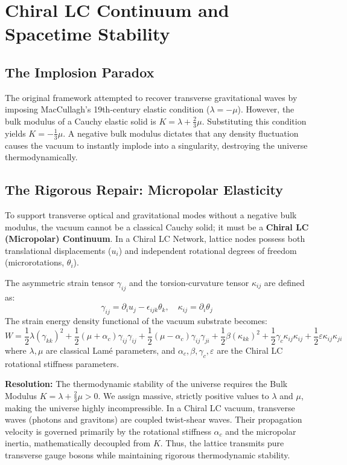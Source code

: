 \documentclass[11pt,a4paper]{article}
\begin{document}
\section{Chiral LC Continuum and Spacetime Stability}

\subsection{The Implosion Paradox}
The original framework attempted to recover transverse gravitational waves by imposing MacCullagh's 19th-century elastic condition ($\lambda = -\mu$). However, the bulk modulus of a Cauchy elastic solid is $K = \lambda + \frac{2}{3}\mu$. Substituting this condition yields $K = -\frac{1}{3}\mu$. A negative bulk modulus dictates that any density fluctuation causes the vacuum to instantly implode into a singularity, destroying the universe thermodynamically.

\subsection{The Rigorous Repair: Micropolar Elasticity}
To support transverse optical and gravitational modes without a negative bulk modulus, the vacuum cannot be a classical Cauchy solid; it must be a \textbf{Chiral LC (Micropolar) Continuum}. In a Chiral LC Network, lattice nodes possess both translational displacements ($u_i$) and independent rotational degrees of freedom (microrotations, $\theta_i$).

The asymmetric strain tensor $\gamma_{ij}$ and the torsion-curvature tensor $\kappa_{ij}$ are defined as:
\begin{equation}
    \gamma_{ij} = \partial_i u_j - \epsilon_{ijk} \theta_k, \quad \kappa_{ij} = \partial_i \theta_j
\end{equation}
The strain energy density functional of the vacuum substrate becomes:
\begin{equation}
    W = \frac{1}{2} \lambda (\gamma_{kk})^2 + \frac{1}{2} (\mu + \alpha_c) \gamma_{ij}\gamma_{ij} + \frac{1}{2} (\mu - \alpha_c) \gamma_{ij}\gamma_{ji} + \frac{1}{2} \beta (\kappa_{kk})^2 + \frac{1}{2} \gamma_c \kappa_{ij}\kappa_{ij} + \frac{1}{2} \varepsilon \kappa_{ij}\kappa_{ji}
\end{equation}
where $\lambda, \mu$ are classical Lamé parameters, and $\alpha_c, \beta, \gamma_c, \varepsilon$ are the Chiral LC rotational stiffness parameters.

\textbf{Resolution:} The thermodynamic stability of the universe requires the Bulk Modulus $K = \lambda + \frac{2}{3}\mu > 0$. We assign massive, strictly positive values to $\lambda$ and $\mu$, making the universe highly incompressible. In a Chiral LC vacuum, transverse waves (photons and gravitons) are coupled twist-shear waves. Their propagation velocity is governed primarily by the rotational stiffness $\alpha_c$ and the micropolar inertia, mathematically decoupled from $K$. Thus, the lattice transmits pure transverse gauge bosons while maintaining rigorous thermodynamic stability.
\end{document}
